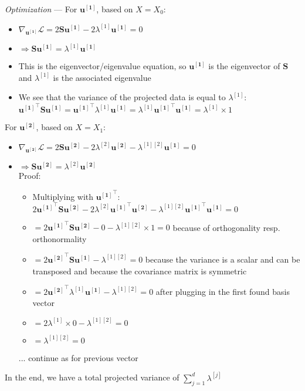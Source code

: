 \emph{Optimization} ---
For $\boldsymbol{u^{[1]}}$, based on $X = X_{0}$: 
\begin{itemize}
    \item $\nabla_{\boldsymbol{u^{[1]}}} \mathcal{L} = 2 \boldsymbol{S} \boldsymbol{u^{[1]}} - 2 \lambda^{[1]} \boldsymbol{u^{[1]}} = 0$
    \item $\Rightarrow \boldsymbol{S} \boldsymbol{u^{[1]}} = \lambda^{[1]} \boldsymbol{u^{[1]}}$
    \item This is the eigenvector/eigenvalue equation, so $\boldsymbol{u^{[1]}}$ is the eigenvector of $\boldsymbol{S}$ and $\lambda^{[1]}$ is the associated eigenvalue
    \item We see that the variance of the projected data is equal to $\lambda^{[1]}$:
    $\boldsymbol{u^{[1]}}^\intercal \boldsymbol{S} \boldsymbol{u^{[1]}} = \boldsymbol{u^{[1]}}^\intercal \lambda^{[1]} \boldsymbol{u^{[1]}} = \lambda^{[1]} \boldsymbol{u^{[1]}}^\intercal \boldsymbol{u^{[1]}} = \lambda^{[1]} \times 1$
\end{itemize}
For $\boldsymbol{u^{[2]}}$, based on $X = X_{1}$: 
\begin{itemize}
    \item $\nabla_{\boldsymbol{u^{[2]}}} \mathcal{L} = 2 \boldsymbol{S} \boldsymbol{u^{[2]}} - 2 \lambda^{[2]} \boldsymbol{u^{[2]}} - \lambda^{[1][2]} \boldsymbol{u^{[1]}} = 0$
    \item $\Rightarrow \boldsymbol{S} \boldsymbol{u^{[2]}} = \lambda^{[2]} \boldsymbol{u^{[2]}}$ \\
    Proof: 
    \begin{itemize}
        \item Multiplying with $\boldsymbol{u^{[1]}}^\intercal$: $2 \boldsymbol{u^{[1]}}^\intercal \boldsymbol{S} \boldsymbol{u^{[2]}} - 2 \lambda^{[2]} \boldsymbol{u^{[1]}}^\intercal \boldsymbol{u^{[2]}} - \lambda^{[1][2]} \boldsymbol{u^{[1]}}^\intercal \boldsymbol{u^{[1]}} = 0$
        \item $ = 2 \boldsymbol{u^{[1]}}^\intercal \boldsymbol{S} \boldsymbol{u^{[2]}} - 0 - \lambda^{[1][2]} \times 1 = 0$ because of orthogonality resp. orthonormality
        \item $ = 2 \boldsymbol{u^{[2]}}^\intercal \boldsymbol{S} \boldsymbol{u^{[1]}} - \lambda^{[1][2]} = 0$ because the variance is a scalar and can be transposed and because the covariance matrix is symmetric
        \item $ = 2 \boldsymbol{u^{[2]}}^\intercal \lambda^{[1]} \boldsymbol{u^{[1]}} - \lambda^{[1][2]} = 0$ after plugging in the first found basis vector
        \item $ = 2 \lambda^{[1]} \times 0 - \lambda^{[1][2]} = 0$
        \item $ = \lambda^{[1][2]} = 0$
    \end{itemize}
    \item [...] continue as for previous vector
\end{itemize}
In the end, we have a total projected variance of $\sum_{j=1}^d \lambda^{[j]}$


